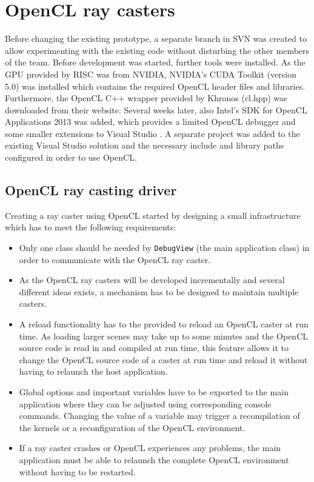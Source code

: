 \section{OpenCL ray casters}
\label{sec:opencl_caster}

Before changing the existing prototype, a separate branch in SVN was created to allow experimenting with the existing code without disturbing the other members of the team. Before development was started, further tools were installed. As the GPU provided by RISC was from NVIDIA, NVIDIA's CUDA Toolkit (version 5.0) was installed which contains the required OpenCL header files and libraries. Furthermore, the OpenCL C++ wrapper provided by Khronos (cl.hpp) was downloaded from their website. Several weeks later, also Intel's SDK for OpenCL Applications 2013 was added, which provides a limited OpenCL debugger and some smaller extensions to Visual Studio \cite{intel_opencl_sdk}. A separate project was added to the existing Visual Studio solution and the necessary include and library paths configured in order to use OpenCL.

\subsection{OpenCL ray casting driver}

Creating a ray caster using OpenCL started by designing a small infrastructure which has to meet the following requirements:

\begin{itemize}
	\item Only one class should be needed by \lstinline!DebugView!  (the main application class) in order to communicate with the OpenCL ray caster.
	\item As the OpenCL ray casters will be developed incrementally and several different ideas exists, a mechanism has to be designed to maintain multiple casters. 
	\item A reload functionality has to the provided to reload an OpenCL caster at run time. As loading larger scenes may take up to some minutes and the OpenCL source code is read in and compiled at run time, this feature allows it to change the OpenCL source code of a caster at run time and reload it without having to relaunch the host application.
	\item Global options and important variables have to be exported to the main application where they can be adjusted using corresponding console commands. Changing the value of a variable may trigger a recompilation of the kernels or a reconfiguration of the OpenCL environment.
	\item If a ray caster crashes or OpenCL experiences any problems, the main application must be able to relaunch the complete OpenCL environment without having to be restarted. 
\end{itemize}

